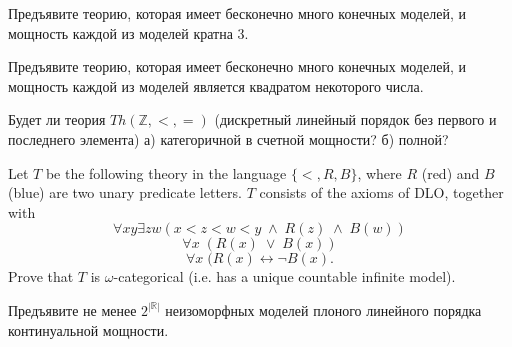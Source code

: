 \setcounter{curtask}{1}


\begin{task}
    Предъявите теорию, которая имеет бесконечно много конечных моделей, и мощность
    каждой из моделей кратна 3.
\end{task}

\begin{task}
    Предъявите теорию, которая имеет бесконечно много конечных моделей, и мощность
    каждой из моделей является квадратом некоторого числа.
\end{task}

\begin{task}
    Будет ли теория $Th(\mathbb{Z}, <, =)$ (дискретный линейный порядок
    без первого и последнего элемента)
    а) категоричной в счетной мощности?
    б) полной?
\end{task}

\begin{task}
    Let $T$ be the following theory in the language $\{<, R, B\}$, where $R$ (red) and $B$ (blue) are two unary predicate letters.
	$T$ consists of the axioms of DLO, together with 
	\[ \forall xy \exists zw (x<z<w<y \; \wedge \; R(z) \; \wedge \; B(w)) \]
	\[ \forall x \; (R(x)\; \vee \; B(x)) \]
	\[ \forall x \; (R(x) \leftrightarrow \neg B(x). \]
	Prove that $T$ is $\omega$-categorical (i.e. has a unique countable infinite model).
\end{task}

\begin{task}
    Предъявите не менее $2^{|\mathbb{R}|}$ неизоморфных моделей плоного линейного порядка
    континуальной мощности.
\end{task}
